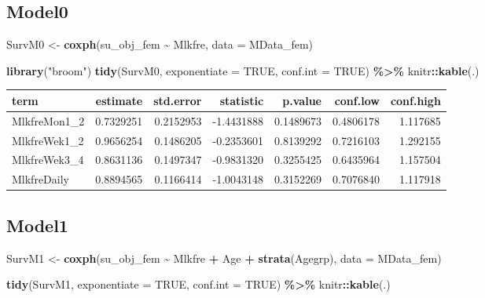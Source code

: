 \documentclass[
]{article}
\newenvironment{Shaded}{\begin{snugshade}}{\end{snugshade}}
\newcommand{\DataTypeTok}[1]{\textcolor[rgb]{0.13,0.29,0.53}{#1}}
\newcommand{\KeywordTok}[1]{\textcolor[rgb]{0.13,0.29,0.53}{\textbf{#1}}}
\newcommand{\NormalTok}[1]{#1}
\newcommand{\OperatorTok}[1]{\textcolor[rgb]{0.81,0.36,0.00}{\textbf{#1}}}
\newcommand{\OtherTok}[1]{\textcolor[rgb]{0.56,0.35,0.01}{#1}}
\newcommand{\StringTok}[1]{\textcolor[rgb]{0.31,0.60,0.02}{#1}}
\begin{document}
\hypertarget{model0-4}{%
\subsection{Model0}\label{model0-4}}

\begin{Shaded}
\begin{Highlighting}[]
\NormalTok{SurvM0 \textless{}{-}}\StringTok{  }\KeywordTok{coxph}\NormalTok{(su\_obj\_fem }\OperatorTok{\textasciitilde{}}\StringTok{ }\NormalTok{Mlkfre, }
                 \DataTypeTok{data =}\NormalTok{ MData\_fem)}

\KeywordTok{library}\NormalTok{(}\StringTok{"broom"}\NormalTok{)}
\KeywordTok{tidy}\NormalTok{(SurvM0, }\DataTypeTok{exponentiate =} \OtherTok{TRUE}\NormalTok{, }\DataTypeTok{conf.int =} \OtherTok{TRUE}\NormalTok{) }\OperatorTok{\%\textgreater{}\%}\StringTok{ }
\StringTok{  }\NormalTok{knitr}\OperatorTok{::}\KeywordTok{kable}\NormalTok{(.)}
\end{Highlighting}
\end{Shaded}

\begin{longtable}[]{@{}lrrrrrr@{}}
\toprule
term & estimate & std.error & statistic & p.value & conf.low &
conf.high\tabularnewline
\midrule
\endhead
MlkfreMon1\_2 & 0.7329251 & 0.2152953 & -1.4431888 & 0.1489673 &
0.4806178 & 1.117685\tabularnewline
MlkfreWek1\_2 & 0.9656254 & 0.1486205 & -0.2353601 & 0.8139292 &
0.7216103 & 1.292155\tabularnewline
MlkfreWek3\_4 & 0.8631136 & 0.1497347 & -0.9831320 & 0.3255425 &
0.6435964 & 1.157504\tabularnewline
MlkfreDaily & 0.8894565 & 0.1166414 & -1.0043148 & 0.3152269 & 0.7076840
& 1.117918\tabularnewline
\bottomrule
\end{longtable}

\hypertarget{model1-4}{%
\subsection{Model1}\label{model1-4}}

\begin{Shaded}
\begin{Highlighting}[]
\NormalTok{SurvM1 \textless{}{-}}\StringTok{  }\KeywordTok{coxph}\NormalTok{(su\_obj\_fem }\OperatorTok{\textasciitilde{}}\StringTok{ }\NormalTok{Mlkfre }\OperatorTok{+}\StringTok{ }\NormalTok{Age }\OperatorTok{+}\StringTok{ }\KeywordTok{strata}\NormalTok{(Agegrp), }
                 \DataTypeTok{data =}\NormalTok{ MData\_fem)}

\KeywordTok{tidy}\NormalTok{(SurvM1, }\DataTypeTok{exponentiate =} \OtherTok{TRUE}\NormalTok{, }\DataTypeTok{conf.int =} \OtherTok{TRUE}\NormalTok{) }\OperatorTok{\%\textgreater{}\%}\StringTok{ }
\StringTok{  }\NormalTok{knitr}\OperatorTok{::}\KeywordTok{kable}\NormalTok{(.)}
\end{Highlighting}
\end{Shaded}
\end{document}
